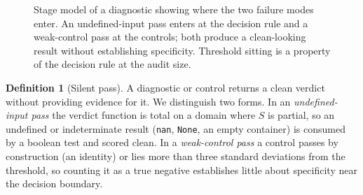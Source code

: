 \documentclass[10pt]{article}
\theoremstyle{definition}
\newtheorem{definition}{Definition}
\begin{document}
\begin{figure}[t]
\centering
{}
\caption{Stage model of a diagnostic showing where the two failure modes enter. An undefined-input pass enters at the decision rule and a weak-control pass at the controls; both produce a clean-looking result without establishing specificity. Threshold sitting is a property of the decision rule at the audit size.}
\label{fig:stages}
\end{figure}

\begin{definition}[Silent pass]
A diagnostic or control returns a clean verdict without providing evidence for it. We distinguish two forms. In an \emph{undefined-input pass} the verdict function is total on a domain where $S$ is partial, so an undefined or indeterminate result (\texttt{nan}, \texttt{None}, an empty container) is consumed by a boolean test and scored clean. In a \emph{weak-control pass} a control passes by construction (an identity) or lies more than three standard deviations from the threshold, so counting it as a true negative establishes little about specificity near the decision boundary.
\end{definition}
\end{document}

